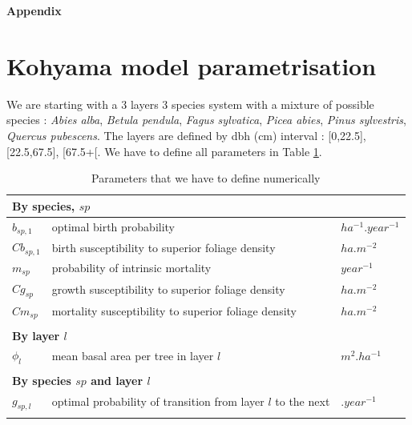\documentclass{article}
\begin{document}
\clearpage

\begin{singlespace}
    \printbibliography
\end{singlespace}

\clearpage


\begin{center}
    \textbf{\Large Appendix}
\end{center}


\renewcommand{\thefigure}{S.\arabic{figure}}
\setcounter{figure}{0}
\renewcommand{\thetable}{S.\arabic{table}}
\setcounter{table}{0}

\appendix

\section{Kohyama model parametrisation}

We are starting with a 3 layers 3 species system with a mixture of possible species : \textit{Abies alba}, \textit{Betula pendula}, \textit{Fagus sylvatica}, \textit{Picea abies}, \textit{Pinus sylvestris}, \textit{Quercus pubescens}. The layers are defined by dbh (cm) interval : [0,22.5], [22.5,67.5], [67.5+[. We have to define all parameters in Table \ref{tab:coeftoparam}.

\begin{table}[H]
    \centering
    \begin{tabular}{l l l}
    \hline
    \hline
    \multicolumn{3}{l}{\textbf{By species}, $sp$} \\
    \hline
    $b_{sp,1}$     & optimal birth probability                              & $ha^{-1}.year^{-1}$ \\
    $Cb_{sp,1}$    & birth susceptibility to superior foliage density       & $ha.m^{-2}$       \\
    $m_{sp}$       & probability of intrinsic mortality                     & $year^{-1}$ \\
    $Cg_{sp}$      & growth susceptibility to superior foliage density      & $ha.m^{-2}$           \\
    $Cm_{sp}$      & mortality susceptibility to superior foliage density   & $ha.m^{-2}$           \\    
    \\
    \multicolumn{3}{l}{\textbf{By layer $l$}} \\
    \hline
    $\phi_{l}$  & mean basal area per tree in layer $l$        & $m^{2}.ha^{-1}$  \\
    \\
    \multicolumn{3}{l}{\textbf{By species $sp$ and layer $l$}} \\
    \hline
    $g_{sp,l}$     & optimal probability of transition from layer $l$ to the next & $.year^{-1}$ \\
    \\
    \hline
    \hline
    \end{tabular}
    \caption{Parameters that we have to define numerically}
    \label{tab:coeftoparam} 
\end{table}
\end{document}
